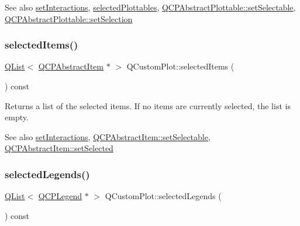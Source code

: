 \begin{DoxySeeAlso}{See also}
\hyperlink{class_q_custom_plot_a5ee1e2f6ae27419deca53e75907c27e5}{set\+Interactions}, \hyperlink{class_q_custom_plot_a747faaab57c56891e901a1e97fa4359a}{selected\+Plottables}, \hyperlink{class_q_c_p_abstract_plottable_ac238d6e910f976f1f30d41c2bca44ac3}{Q\+C\+P\+Abstract\+Plottable\+::set\+Selectable}, \hyperlink{class_q_c_p_abstract_plottable_a219bc5403a9d85d3129165ec3f5ae436}{Q\+C\+P\+Abstract\+Plottable\+::set\+Selection} 
\end{DoxySeeAlso}
\mbox{\label{class_q_custom_plot_afda487bcf2d6cf1a57173d82495e29ba}} 
\subsubsection{\texorpdfstring{selected\+Items()}{selectedItems()}}
{\footnotesize\ttfamily \hyperlink{class_q_list}{Q\+List}$<$ \hyperlink{class_q_c_p_abstract_item}{Q\+C\+P\+Abstract\+Item} $\ast$ $>$ Q\+Custom\+Plot\+::selected\+Items (\begin{DoxyParamCaption}{ }\end{DoxyParamCaption}) const}

Returns a list of the selected items. If no items are currently selected, the list is empty.

\begin{DoxySeeAlso}{See also}
\hyperlink{class_q_custom_plot_a5ee1e2f6ae27419deca53e75907c27e5}{set\+Interactions}, \hyperlink{class_q_c_p_abstract_item_a8a8e32a55bc478b849756a78c2d87fd2}{Q\+C\+P\+Abstract\+Item\+::set\+Selectable}, \hyperlink{class_q_c_p_abstract_item_a203de94ad586cc44d16c9565f49d3378}{Q\+C\+P\+Abstract\+Item\+::set\+Selected} 
\end{DoxySeeAlso}
\mbox{\label{class_q_custom_plot_ac87624ddff1cbf4064781a8e8ae321c4}} 
\subsubsection{\texorpdfstring{selected\+Legends()}{selectedLegends()}}
{\footnotesize\ttfamily \hyperlink{class_q_list}{Q\+List}$<$ \hyperlink{class_q_c_p_legend}{Q\+C\+P\+Legend} $\ast$ $>$ Q\+Custom\+Plot\+::selected\+Legends (\begin{DoxyParamCaption}{ }\end{DoxyParamCaption}) const}

